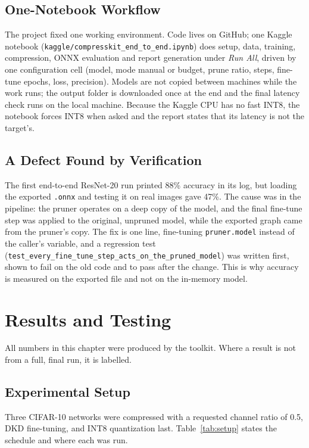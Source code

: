 \documentclass[oneside,a4paper,12pt]{report}
\newcommand{\code}[1]{\texttt{\small #1}}
\begin{document}
\section{One-Notebook Workflow}
The project fixed one working environment. Code lives on GitHub; one Kaggle notebook (\code{kaggle/compresskit\_end\_to\_end.ipynb}) does setup, data, training, compression, ONNX evaluation and report generation under \emph{Run All}, driven by one configuration cell (model, mode manual or budget, prune ratio, steps, fine-tune epochs, loss, precision). Models are not copied between machines while the work runs; the output folder is downloaded once at the end and the final latency check runs on the local machine. Because the Kaggle CPU has no fast INT8, the notebook forces INT8 when asked and the report states that its latency is not the target's.

\section{A Defect Found by Verification}\label{sec:defect}
The first end-to-end ResNet-20 run printed 88\% accuracy in its log, but loading the exported \code{.onnx} and testing it on real images gave 47\%. The cause was in the pipeline: the pruner operates on a deep copy of the model, and the final fine-tune step was applied to the original, unpruned model, while the exported graph came from the pruner's copy. The fix is one line, fine-tuning \code{pruner.model} instead of the caller's variable, and a regression test (\code{test\_every\_fine\_tune\_step\_acts\_on\_the\_pruned\_model}) was written first, shown to fail on the old code and to pass after the change. This is why accuracy is measured on the exported file and not on the in-memory model.

\chapter{Results and Testing}
All numbers in this chapter were produced by the toolkit. Where a result is not from a full, final run, it is labelled.

\section{Experimental Setup}
Three CIFAR-10 networks were compressed with a requested channel ratio of 0.5, DKD fine-tuning, and INT8 quantization last. Table~\ref{tab:setup} states the schedule and where each was run.
\end{document}
